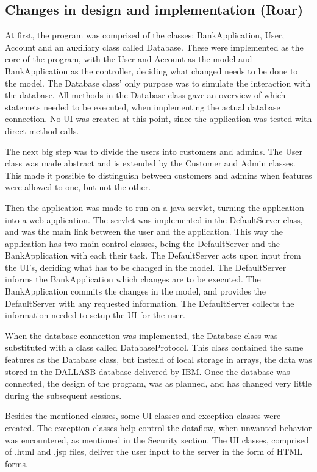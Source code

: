 


\subsection{Changes in design and implementation (Roar)}

At first, the program was comprised of the classes: BankApplication, User, Account and an auxiliary class called Database. These were implemented as the core of the program, with the User and Account as the model and BankApplication as the controller, deciding what changed needs to be done to the model. The Database class' only purpose was to simulate the interaction with the database. All methods in the Database class gave an overview of which statemets needed to be executed, when implementing the actual database connection. No UI was created at this point, since the application was tested with direct method calls. 

The next big step was to divide the users into customers and admins. The User class was made abstract and is extended by the Customer and Admin classes. This made it possible to distinguish between customers and admins when features were allowed to one, but not the other.

Then the application was made to run on a java servlet, turning the application into a web application. The servlet was implemented in the DefaultServer class, and was the main link between the user and the application. This way the application has two main control classes, being the DefaultServer and the BankApplication with each their task. The DefaultServer acts upon input from the UI's, deciding what has to be changed in the model. The DefaultServer informs the BankApplication which changes are to be executed. The BankApplication commits the changes in the model, and provides the DefaultServer with any requested information. The DefaultServer collects the information needed to setup the UI for the user.

When the database connection was implemented, the Database class was substituted with a class called DatabaseProtocol. This class contained the same features as the Database class, but instead of local storage in arrays, the data was stored in the DALLASB database delivered by IBM. Once the database was connected, the design of the program, was as planned, and has changed very little during the subsequent sessions. 

Besides the mentioned classes, some UI classes and exception classes were created. The exception classes help control the dataflow, when unwanted behavior was encountered, as mentioned in the Security section. The UI classes, comprised of .html and .jsp files, deliver the user input to the server in the form of HTML forms.

